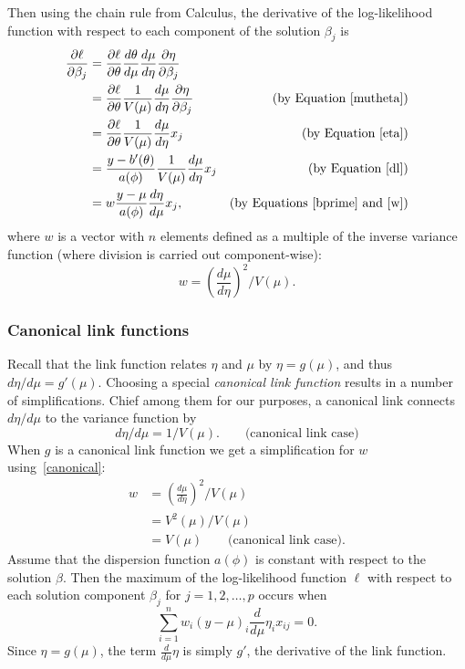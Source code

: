 \documentclass[10pt]{article} %
\begin{document}
Then using the chain rule from Calculus, the derivative of the log-likelihood
function with respect to each component of the solution $\beta_j$ is
\begin{align}
\frac{\partial\ell}{\partial\beta_j}
&= \frac{\partial\ell}{\partial\theta}\frac{d\theta}{d\mu}\frac{d\mu}{d\eta}\frac{\partial\eta}{\partial\beta_j} \nonumber\\
&= \frac{\partial\ell}{\partial\theta}\frac{1}{V(\mu)}\frac{d\mu}{d\eta}\frac{\partial\eta}{\partial\beta_j} 
    &\mbox{(by Equation \ref{mutheta})} \nonumber\\
&= \frac{\partial\ell}{\partial\theta}\frac{1}{V(\mu)}\frac{d\mu}{d\eta}x_j
    &\mbox{(by Equation \ref{eta})} \nonumber\\
&= \frac{y- b'(\theta)}{a(\phi)}\frac{1}{V(\mu)}\frac{d\mu}{d\eta}x_j
    &\mbox{(by Equation \ref{dl})} \nonumber\\
&= w\frac{y-\mu}{a(\phi)}\frac{d\eta}{d\mu}x_j,
    &\mbox{(by Equations \ref{bprime} and \ref{w})} \label{dldb}
\end{align}
where $w$ is a vector with $n$ elements defined as a multiple of the inverse variance function
(where division is carried out component-wise):
\begin{equation}\label{w}
w = \left(\frac{d\mu}{d\eta}\right)^2 \bigg/ V(\mu).
\end{equation}

\subsubsection*{Canonical link functions}
Recall that
the link function relates $\eta$ and $\mu$ by $\eta=g(\mu)$,
and thus $d\eta/d\mu = g'(\mu)$. Choosing a special \emph{canonical link function}
results in a number of simplifications. Chief among them for our
purposes, a canonical link connects $d\eta/d\mu$ to the variance function by
\begin{equation}
\label{canonical}
{d\eta}/{d\mu}={1}/{V(\mu)}.\qquad\mbox{(canonical link case)}
\end{equation}
When $g$ is a canonical link function we get a simplification
for $w$ using~\ref{canonical}:
\begin{align}
w &= \left(\frac{d\mu}{d\eta}\right)^2 \bigg/ V(\mu) \nonumber \\
&= V^2(\mu) / V(\mu) \nonumber \\
&= V(\mu)\qquad\mbox{(canonical link case)}.  \label{W_canonical}
\end{align}
Assume that the dispersion function $a(\phi)$ is constant with respect to the
solution $\beta$. Then the maximum of the log-likelihood function $\ell$ with
respect to each solution component $\beta_j$ for $j=1, 2, \ldots, p$ occurs when
\begin{equation}\label{max_loglik}
\sum_{i=1}^n w_i(y-\mu)_i\frac{d}{d\mu}\eta_ix_{ij} = 0.
\end{equation}
Since $\eta=g(\mu)$, the term $\frac{d}{d\mu}\eta$ is
simply $g'$, the derivative of the link function.
\end{document}
